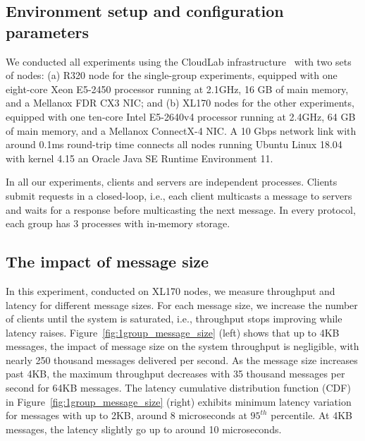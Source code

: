 \subsection{Environment setup and configuration parameters}
\label{sec:evaluation:setup}

We conducted all experiments using the CloudLab infrastructure~\cite{DuplyakinATC19cloudlab} with two sets of nodes: 
(a) R320 node for the single-group experiments, equipped with one eight-core Xeon E5-2450 processor running at 2.1GHz, 16 GB of main memory, and a Mellanox FDR CX3 NIC; and (b) XL170 nodes for the other experiments, equipped with one ten-core Intel E5-2640v4 processor running at 2.4GHz, 64 GB of main memory, and a Mellanox ConnectX-4 NIC. 
A 10 Gbps network link with around 0.1ms round-trip time connects all nodes running Ubuntu Linux 18.04 with kernel 4.15 an Oracle Java SE Runtime Environment 11. 

In all our experiments, clients and servers are independent processes. 
Clients submit requests in a closed-loop, i.e., each client multicasts a message to servers and waits for a response before multicasting the next message. 
In every protocol, each group has 3 processes with in-memory storage.


\subsection{The impact of message size}
\label{sec:evaluation:micro}

In this experiment, conducted on XL170 nodes, we measure \libname throughput and latency for different message sizes.
For each message size, we increase the number of clients until the system is saturated, i.e., throughput stops improving while latency raises.
Figure~\ref{fig:1group_message_size} (left) shows that up to 4KB messages, the impact of message size on the system throughput is negligible, with nearly 250 thousand messages delivered per second. 
As the message size increases past 4KB, the maximum throughput decreases with 35 thousand messages per second for 64KB messages.
The latency cumulative distribution function (CDF) in Figure~\ref{fig:1group_message_size} (right) exhibits minimum latency variation for messages with up to 2KB, around 8 microseconds at $95^{th}$ percentile. At 4KB messages, the latency slightly go up to around 10 microseconds.

